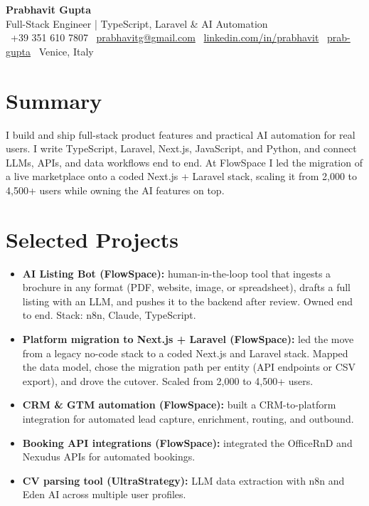 \documentclass[a4paper,7pt]{article}
\begin{document}
\renewcommand{\baselinestretch}{0.72}\small\normalsize

\begin{center}
 {\Huge\bfseries Prabhavit Gupta}\\[3pt]
 {\color{accent}\large Full-Stack Engineer | TypeScript, Laravel \& AI Automation}\\[5pt]
 \faPhone\ +39 351 610 7807 \quad
 \faEnvelope\ \href{mailto:prabhavitg@gmail.com}{prabhavitg@gmail.com} \quad
 \faLinkedin\ \href{https://www.linkedin.com/in/prabhavit/}{linkedin.com/in/prabhavit} \quad
 \faGithub\ \href{https://github.com/prab-gupta}{prab-gupta} \quad
 \faMapMarker*\ Venice, Italy
\end{center}

\section{Summary}
I build and ship full-stack product features and practical AI automation for real users. I write TypeScript, Laravel, Next.js, JavaScript, and Python, and connect LLMs, APIs, and data workflows end to end. At FlowSpace I led the migration of a live marketplace onto a coded Next.js + Laravel stack, scaling it from 2,000 to 4,500+ users while owning the AI features on top.

\section{Selected Projects}
\begin{itemize}
 \item \textbf{AI Listing Bot (FlowSpace):} human-in-the-loop tool that ingests a brochure in any format (PDF, website, image, or spreadsheet), drafts a full listing with an LLM, and pushes it to the backend after review. Owned end to end. Stack: n8n, Claude, TypeScript.
 \item \textbf{Platform migration to Next.js + Laravel (FlowSpace):} led the move from a legacy no-code stack to a coded Next.js and Laravel stack. Mapped the data model, chose the migration path per entity (API endpoints or CSV export), and drove the cutover. Scaled from 2,000 to 4,500+ users.
 \item \textbf{CRM \& GTM automation (FlowSpace):} built a CRM-to-platform integration for automated lead capture, enrichment, routing, and outbound.
 \item \textbf{Booking API integrations (FlowSpace):} integrated the OfficeRnD and Nexudus APIs for automated bookings.
 \item \textbf{CV parsing tool (UltraStrategy):} LLM data extraction with n8n and Eden AI across multiple user profiles.
\end{itemize}
\end{document}
